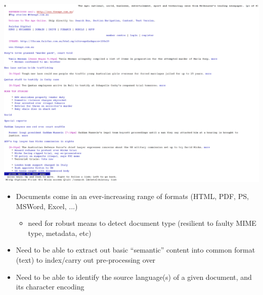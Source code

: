 \documentclass[a4paper,landscape,headrule,footrule,xetex]{foils}
\begin{document}

\begin{center}
  \includegraphics[height=1.0\textheight]{../pics/lynx.eps}
\end{center}





\begin{itemize}
\item Documents come in an ever-increasing range of formats (HTML,
  PDF, PS, MSWord, Excel, ...)
  \begin{itemize}
  \item need for robust means to detect document type (resilient to
    faulty MIME type, metadata, etc)
  \end{itemize}
\item Need to be able to extract out basic ``semantic'' content into
  common format (text) to index/carry out pre-processing over
\item Need to be able to identify the source language(s) of a given
  document, and its character encoding
\end{itemize}



\end{document}
